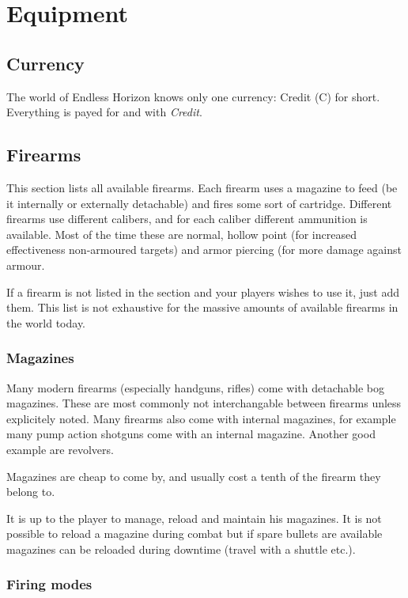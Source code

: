 \chapter{Equipment}

\section{Currency}

The world of Endless Horizon knows only one currency: Credit (C) for short.
Everything is payed for and with \emph{Credit}.

\section{Firearms}

This section lists all available firearms. Each firearm uses a magazine to feed
(be it internally or externally detachable) and fires some sort of cartridge.
Different firearms use different calibers, and for each caliber different
ammunition is available. Most of the time these are normal, hollow point (for
increased effectiveness non-armoured targets) and armor piercing (for more
damage against armour.

If a firearm is not listed in the section and your players wishes to use it,
just add them. This list is not exhaustive for the massive amounts of available
firearms in the world today.

\subsection{Magazines}

Many modern firearms (especially handguns, rifles) come with detachable bog
magazines. These are most commonly not interchangable between firearms unless
explicitely noted. Many firearms also come with internal magazines, for example
many pump action shotguns come with an internal magazine. Another good example
are revolvers.

Magazines are cheap to come by, and usually cost a tenth of the firearm they
belong to.

It is up to the player to manage, reload and maintain his magazines. It is not
possible to reload a magazine during combat but if spare bullets are available
magazines can be reloaded during downtime (travel with a shuttle etc.).

\subsection{Firing modes}

